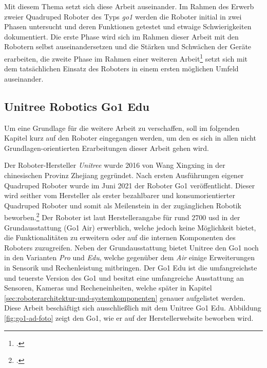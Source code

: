 Mit diesem Thema setzt sich diese Arbeit auseinander.
Im Rahmen des Erwerb zweier Quadruped Roboter des Typs \emph{\gls{go1}} werden die Roboter initial in zwei Phasen
untersucht und deren Funktionen getestet und etwaige Schwierigkeiten dokumentiert.
Die erste Phase wird sich im Rahmen dieser Arbeit mit den Robotern selbst auseinandersetzen und die Stärken und Schwächen der Geräte erarbeiten,
die zweite Phase im Rahmen einer weiteren Arbeit\footcite{jonas} setzt sich mit dem tatsächlichen Einsatz des Roboters
in einem ersten möglichen Umfeld auseinander.

\subsection{Unitree Robotics Go1 Edu}
\label{subsec:unitree-robotics-go1-edu}

Um eine Grundlage für die weitere Arbeit zu verschaffen, soll im folgenden Kapitel kurz auf den Roboter eingegangen werden,
um den es sich in allen nicht Grundlagen-orientierten Erarbeitungen dieser Arbeit gehen wird.

Der Roboter-Hersteller \emph{Unitree} wurde \num{2016} von Wang Xingxing in der chinesischen Provinz Zhejiang gegründet.
Nach ersten Ausführungen eigener Quadruped Roboter wurde im Juni \num{2021} der Roboter Go1 veröffentlicht.
Dieser wird seither vom Hersteller als erster bezahlbarer und konsumorientierter Quadruped Roboter und somit als
Meilenstein in der zugänglichen Robotik beworben.\footcite{unitree-about}
Der Roboter ist laut Herstellerangabe für rund \num{2700} \gls{usd} in der Grundausstattung (Go1 Air) erwerblich, welche jedoch
keine Möglichkeit bietet, die Funktionalitäten zu erweitern oder auf die internen Komponenten des Roboters zuzugreifen.
Neben der Grundausstattung bietet Unitree den Go1 noch in den Varianten \emph{Pro} und \emph{Edu}, welche gegenüber
dem \emph{Air} einige Erweiterungen in Sensorik und Rechenleistung mitbringen.
Der Go1 Edu ist die umfangreichste und teuerste Version des Go1 und besitzt eine umfangreiche Ausstattung an Sensoren,
Kameras und Recheneinheiten, welche später in Kapitel \ref{sec:roboterarchitektur-und-systemkomponenten} genauer aufgelistet
werden.
Diese Arbeit beschäftigt sich ausschließlich mit dem Unitree Go1 Edu.
Abbildung \ref{fig:go1-ad-foto} zeigt den Go1, wie er auf der Herstellerwebsite beworben wird.

